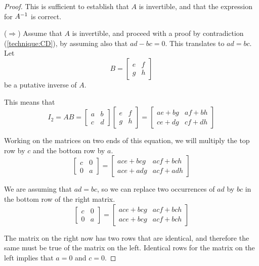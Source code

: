 \documentclass{ximera}
\begin{document}
\begin{theorem}
\begin{proof}
  This is sufficient to establish that $A$ is invertible, and that the expression for $A^{-1}$ is correct.
  
  ($\Rightarrow$) Assume that $A$ is invertible, and proceed with a
  proof by contradiction (\ref{technique:CD}), by assuming also that
  $ad-bc=0$.  This translates to $ad=bc$.  Let
  \[
    B=
    \begin{bmatrix}
      e&f\\
      g&h
    \end{bmatrix}
  \]
  be a putative inverse of $A$.
  
  This means that
  \[
    I_2=AB=
    \begin{bmatrix}
      a&b\\
      c&d
    \end{bmatrix}
    \begin{bmatrix}
      e&f\\
      g&h
    \end{bmatrix}
    =
    \begin{bmatrix}
      ae+bg & af+bh\\
      ce+dg & cf+dh
    \end{bmatrix}
  \]

  Working on the matrices on two ends of this equation, we will multiply the top row by $c$ and the bottom row by $a$.
  \[
    \begin{bmatrix}
      c&0\\
      0&a
    \end{bmatrix}
    =
    \begin{bmatrix}
      ace+bcg & acf+bch\\
      ace+adg & acf+adh
    \end{bmatrix}
  \]

  We are assuming that $ad=bc$, so we can replace two occurrences of $ad$ by $bc$ in the bottom row of the right matrix.
  \[
    \begin{bmatrix}
      c&0\\
      0&a
    \end{bmatrix}
    =
    \begin{bmatrix}
      ace+bcg & acf+bch\\
      ace+bcg & acf+bch
    \end{bmatrix}
  \]

  The matrix on the right now has two rows that are identical, and
  therefore the same must be true of the matrix on the left.
  Identical rows for the matrix on the left implies that $a=0$ and
  $c=0$.


\end{proof}
\end{theorem}
\end{document}
